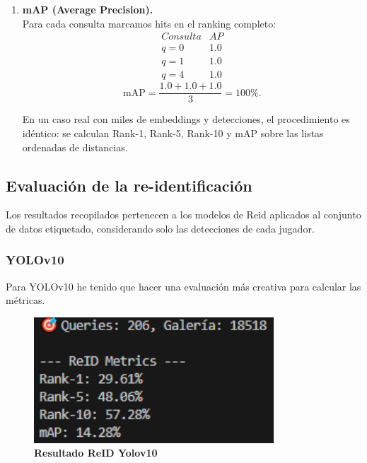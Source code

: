 \documentclass[12pt, a4paper, twoside]{article}
\begin{document}
\begin{enumerate}
 		\item \textbf{mAP (Average Precision).}\\
 		Para cada consulta marcamos hits en el ranking completo:
 		\[
 		\begin{array}{l|c}
 			Consulta & AP \\ \hline
 			q=0 & 1.0 \\
 			q=1 & 1.0 \\
 			q=4 & 1.0
 		\end{array}
 		\]
 		\[
 		\mathrm{mAP} = \frac{1.0 + 1.0 + 1.0}{3} = 100\%.
 		\]
 		
 		En un caso real con miles de embeddings y detecciones, el procedimiento es idéntico: 
 		se calculan Rank-1, Rank-5, Rank-10 y mAP sobre las listas ordenadas de distancias.
 	\end{enumerate}
 	
 	\subsection{Evaluación de la re-identificación}
 	
 	Los resultados recopilados pertenecen a los modelos de Reid aplicados al conjunto de datos etiquetado, considerando solo las detecciones de cada jugador. 
 	
 	\subsubsection{YOLOv10}
 	
 	Para YOLOv10 he tenido que hacer una evaluación más creativa para calcular las métricas.
 	
 	\begin{figure}[H]
 		\centering
 		\includegraphics[width=0.8\textwidth]{image/metricas_reid_yolo10}
 		\caption{\textbf{Resultado ReID Yolov10}}
 		\label{fig:Resultado Yolov10 reid}
 	\end{figure}
 	
\end{document}
